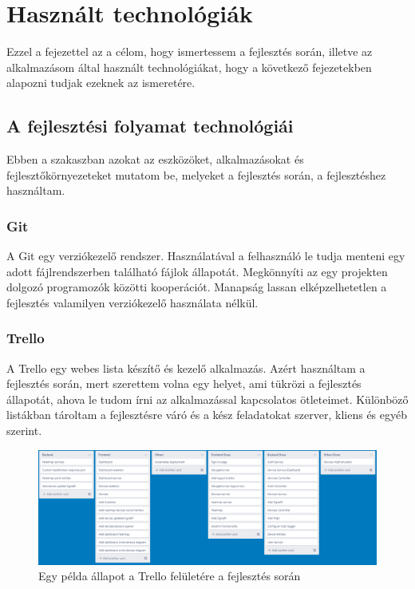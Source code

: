 \chapter{Használt technológiák}
\label{chapt:birdmap-technologies}
Ezzel a fejezettel az a célom, hogy ismertessem a fejlesztés során, illetve az alkalmazásom által használt technológiákat,
hogy a következő fejezetekben alapozni tudjak ezeknek az ismeretére.

\section{A fejlesztési folyamat technológiái}
Ebben a szakaszban azokat az eszközöket, alkalmazásokat és fejlesztőkörnyezeteket mutatom be, melyeket a fejlesztés során, a fejlesztéshez használtam. 

\subsection{Git}
A Git\cite{git} egy verziókezelő rendszer. Használatával a felhasználó le tudja menteni egy adott fájlrendszerben található fájlok állapotát.
Megkönnyíti az egy projekten dolgozó programozók közötti kooperációt. Manapság lassan elképzelhetetlen a fejlesztés valamilyen verziókezelő használata nélkül.

\subsection{Trello}
A Trello\cite{trello} egy webes lista készítő és kezelő alkalmazás. 
Azért használtam a fejlesztés során, mert szerettem volna egy helyet, ami tükrözi a fejlesztés állapotát, ahova le tudom írni az alkalmazással kapcsolatos ötleteimet.
Különböző listákban tároltam a fejlesztésre váró és a kész feladatokat szerver, kliens és egyéb szerint.

\begin{figure}[!ht]
    \centering
    \includegraphics[width=150mm, keepaspectratio]{figures/trello-cropped.png}
    \caption{Egy példa állapot a Trello felületére a fejlesztés során}
    \label{fig:trello}
\end{figure}


